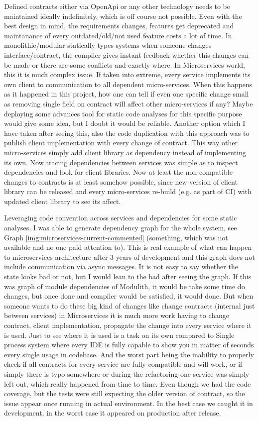 Defined contracts either via OpenApi or any other technology needs to be maintained ideally indefinitely, which is off course not possible. Even with the best design in mind, the requirements changes, features get deprecated and maintanance of every outdated/old/not used feature costs a lot of time. In monolithic/modular statically types systems when someone changes interface/contract, the compiler gives instant feedback whether this changes can be made or there are some conflicts and exactly where. In Microservices world, this it is much complex issue. If taken into extreme, every service implements its own client to communication to all dependent micro-services. When this happens as it happened in this project, how one can tell if even one specific change small as removing single field on contract will affect other micro-services if any? Maybe deploying some advances tool for static code analyses for this specific purpose would give some idea, but I doubt it would be reliable. Another option which I have taken after seeing this, also the code duplication with this approach was to publish client implementation with every change of contract. This way other micro-services simply add client library as dependency instead of implementing its own. Now tracing dependencies between services was simple as to inspect dependencies and look for client libraries. Now at least the non-compatible changes to contracts is at least somehow possible, since new version of client library can be released and every micro-services re-build (e.g. as part of CI) with updated client library to see its affect.

Leveraging code convention across services and dependencies for some static analyses, I was able to generate dependency graph for the whole system, see Graph \ref{img:microservices-current-commented} (something, which was not available and no one paid attention to). This is real-example of what can happen to microservices architecture after 3 years of development and this graph does not include communication via async messages. It is not easy to say whether the state looks bad or not, but I would lean to the bad after seeing the graph. If this was graph of module dependencies of Modulith, it would be take some time do changes, but once done and compiler would be satisfied, it would done. But when someone wants to do these big kind of changes like change contracts (internal just between services) in Microservices it is much more work having to change contract, client implementation, propagate the change into every service where it is used. Just to see where it is used is a task on its own compared to Single process system where every IDE is fully capable to show you in matter of seconds every single usage in codebase. And the worst part being the inability to properly check if all contracts for every service are fully compatible and will work, or if simply there is typo somewhere or during the refactoring one service was simply left out, which really  happened from time to time. Even though we had the code coverage, but the tests were still expecting the older version of contract, so the issue appear once running in actual environment. In the best case we caught it in development, in the worst case it appeared on production after release.

